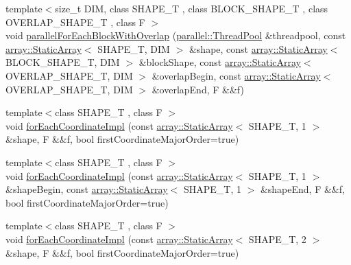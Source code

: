 \begin{DoxyCompactItemize}
\item 
{\footnotesize template$<$size\+\_\+t D\+IM, class S\+H\+A\+P\+E\+\_\+T , class B\+L\+O\+C\+K\+\_\+\+S\+H\+A\+P\+E\+\_\+T , class O\+V\+E\+R\+L\+A\+P\+\_\+\+S\+H\+A\+P\+E\+\_\+T , class F $>$ }\\void \hyperlink{namespacenifty_1_1tools_af942eef6747790a4f8d6868b1f95c3ee}{parallel\+For\+Each\+Block\+With\+Overlap} (\hyperlink{classnifty_1_1parallel_1_1ThreadPool}{parallel\+::\+Thread\+Pool} \&threadpool, const \hyperlink{namespacenifty_1_1array_a683f151f19c851754e0c6d55ed16a0c2}{array\+::\+Static\+Array}$<$ S\+H\+A\+P\+E\+\_\+T, D\+IM $>$ \&shape, const \hyperlink{namespacenifty_1_1array_a683f151f19c851754e0c6d55ed16a0c2}{array\+::\+Static\+Array}$<$ B\+L\+O\+C\+K\+\_\+\+S\+H\+A\+P\+E\+\_\+T, D\+IM $>$ \&block\+Shape, const \hyperlink{namespacenifty_1_1array_a683f151f19c851754e0c6d55ed16a0c2}{array\+::\+Static\+Array}$<$ O\+V\+E\+R\+L\+A\+P\+\_\+\+S\+H\+A\+P\+E\+\_\+T, D\+IM $>$ \&overlap\+Begin, const \hyperlink{namespacenifty_1_1array_a683f151f19c851754e0c6d55ed16a0c2}{array\+::\+Static\+Array}$<$ O\+V\+E\+R\+L\+A\+P\+\_\+\+S\+H\+A\+P\+E\+\_\+T, D\+IM $>$ \&overlap\+End, F \&\&f)
\item 
{\footnotesize template$<$class S\+H\+A\+P\+E\+\_\+T , class F $>$ }\\void \hyperlink{namespacenifty_1_1tools_a2f0a7c111de3217482567849aecac6b6}{for\+Each\+Coordinate\+Impl} (const \hyperlink{namespacenifty_1_1array_a683f151f19c851754e0c6d55ed16a0c2}{array\+::\+Static\+Array}$<$ S\+H\+A\+P\+E\+\_\+T, 1 $>$ \&shape, F \&\&f, bool first\+Coordinate\+Major\+Order=true)
\item 
{\footnotesize template$<$class S\+H\+A\+P\+E\+\_\+T , class F $>$ }\\void \hyperlink{namespacenifty_1_1tools_ade4cdd4e464112baf195beda9d662a96}{for\+Each\+Coordinate\+Impl} (const \hyperlink{namespacenifty_1_1array_a683f151f19c851754e0c6d55ed16a0c2}{array\+::\+Static\+Array}$<$ S\+H\+A\+P\+E\+\_\+T, 1 $>$ \&shape\+Begin, const \hyperlink{namespacenifty_1_1array_a683f151f19c851754e0c6d55ed16a0c2}{array\+::\+Static\+Array}$<$ S\+H\+A\+P\+E\+\_\+T, 1 $>$ \&shape\+End, F \&\&f, bool first\+Coordinate\+Major\+Order=true)
\item 
{\footnotesize template$<$class S\+H\+A\+P\+E\+\_\+T , class F $>$ }\\void \hyperlink{namespacenifty_1_1tools_ad2a256c13ab9dfa6bdd0a1d32ecf49fc}{for\+Each\+Coordinate\+Impl} (const \hyperlink{namespacenifty_1_1array_a683f151f19c851754e0c6d55ed16a0c2}{array\+::\+Static\+Array}$<$ S\+H\+A\+P\+E\+\_\+T, 2 $>$ \&shape, F \&\&f, bool first\+Coordinate\+Major\+Order=true)

\end{DoxyCompactItemize}
